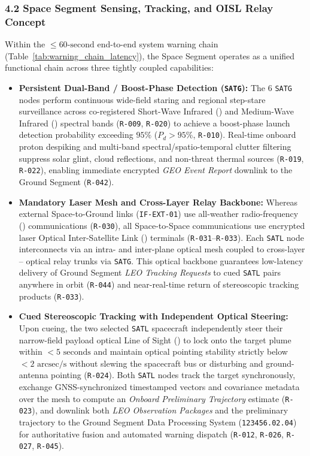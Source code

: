 \subsubsection{4.2 Space Segment Sensing, Tracking, and OISL Relay Concept}

Within the $\le 60\text{-second}$ end-to-end system warning chain (Table~\ref{tab:warning_chain_latency}), the Space Segment operates as a unified functional chain across three tightly coupled capabilities:
\begin{itemize}
    \item \textbf{Persistent Dual-Band / Boost-Phase Detection (\texttt{SATG}):} The 6 \texttt{SATG} nodes perform continuous wide-field staring and regional step-stare surveillance across co-registered Short-Wave Infrared () and Medium-Wave Infrared () spectral bands (\texttt{R-009}, \texttt{R-020}) to achieve a boost-phase launch detection probability exceeding $95\%$ ($P_d > 95\%$, \texttt{R-010}). Real-time onboard proton despiking and multi-band spectral/spatio-temporal clutter filtering suppress solar glint, cloud reflections, and non-threat thermal sources (\texttt{R-019}, \texttt{R-022}), enabling immediate encrypted \emph{GEO Event Report} downlink to the Ground Segment (\texttt{R-042}).
    \item \textbf{Mandatory Laser  Mesh and Cross-Layer Relay Backbone:} Whereas external Space-to-Ground links (\texttt{IF-EXT-01}) use all-weather radio-frequency () communications (\texttt{R-030}), all Space-to-Space communications use encrypted laser Optical Inter-Satellite Link () terminals (\texttt{R-031}--\texttt{R-033}). Each \texttt{SATL} node interconnects via an intra- and inter-plane  optical mesh coupled to cross-layer -- optical relay trunks via \texttt{SATG}. This optical backbone guarantees low-latency delivery of Ground Segment \emph{LEO Tracking Requests} to cued \texttt{SATL} pairs anywhere in orbit (\texttt{R-044}) and near-real-time return of stereoscopic tracking products (\texttt{R-033}).
    \item \textbf{Cued Stereoscopic Tracking with Independent Optical  Steering:} Upon cueing, the two selected \texttt{SATL} spacecraft independently steer their narrow-field payload optical Line of Sight () to lock onto the target plume within $< 5\text{ seconds}$ and maintain optical  pointing stability strictly below $< 2\text{ arcsec/s}$ without slewing the spacecraft bus or disturbing  and ground-antenna pointing (\texttt{R-024}). Both \texttt{SATL} nodes track the target synchronously, exchange GNSS-synchronized timestamped  vectors and covariance metadata over the  mesh to compute an \emph{Onboard Preliminary Trajectory} estimate (\texttt{R-023}), and downlink both \emph{LEO Observation Packages} and the preliminary trajectory to the Ground Segment Data Processing System (\texttt{123456.02.04}) for authoritative fusion and automated warning dispatch (\texttt{R-012}, \texttt{R-026}, \texttt{R-027}, \texttt{R-045}).
\end{itemize}

